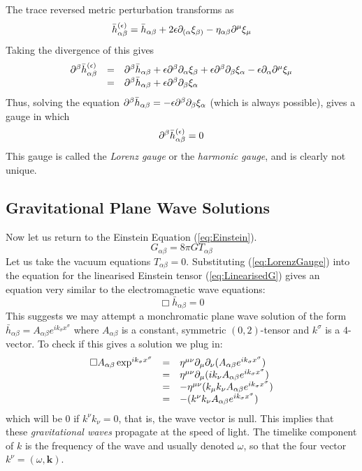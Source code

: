 The trace reversed metric perturbation transforms as 
\[ \bar{h}^{(\epsilon)}_{\alpha \beta} = \bar{h}_{\alpha \beta} + 2 \epsilon {\partial}_{({\alpha}} \xi_{{\beta})} -\eta_{{\alpha} {\beta}}{\partial}^\mu \xi_\mu \]
Taking the divergence of this gives 
\begin{equation}
\begin{array}{lcl}
{\partial}^{\beta} \bar{h}^{(\epsilon)}_{{\alpha} {\beta}} &=& {\partial}^{\beta} \bar{h}_{\alpha \beta} + \epsilon {\partial}^{\beta} {\partial}_{\alpha} \xi_{\beta} + \epsilon {\partial}^{\beta} {\partial}_{\beta} \xi_{\alpha} - \epsilon {\partial}_{\alpha} {\partial}^\mu \xi_\mu\\
&=& {\partial}^{\beta} \bar{h}_{\alpha \beta}+ \epsilon{\partial}^{\beta} {\partial}_{\beta} \xi_{\alpha}
\end{array}
\end{equation}
Thus, solving the equation ${\partial}^{\beta} \bar{h}_{\alpha \beta}=-\epsilon {\partial}^{\beta} {\partial}_{\beta} \xi_{\alpha}$ (which is always possible), gives a gauge in which
\begin{equation}
{\partial}^{\beta} \bar{h}^{(\epsilon)}_{{\alpha} {\beta}} = 0
\label{eq:LorenzGauge}
\end{equation}
This gauge is called the \emph{Lorenz gauge} or the \textit{harmonic gauge}, and is clearly not unique.

\subsection{Gravitational Plane Wave Solutions }
Now let us return to the Einstein Equation (\ref{eq:Einstein}). 
\[ G_{\alpha \beta} = 8 \pi G T_{\alpha \beta} \]
Let us take the vacuum equations $T_{\alpha \beta} =0$. Substituting (\ref{eq:LorenzGauge}) into the equation for the linearised Einstein tensor (\ref{eq:LinearisedG}) gives an equation very similar to the electromagnetic wave equations:
\begin{equation}
\Box \bar{h}_{\alpha \beta} = 0
\end{equation}
This suggests we may attempt a monchromatic plane wave solution of the form $\bar{h}_{\alpha \beta}=A_{\alpha \beta} e^{i k_\sigma x^\sigma}$ where $A_{\alpha \beta}$ is a constant, symmetric $(0,2)$-tensor and $k^\sigma$ is a $4$-vector. To check if this gives a solution we plug in:
\begin{equation}
\begin{array}{lcl}
\Box A_{\alpha \beta} \exp^{i k_\sigma x^\sigma} &=& \eta^{\mu \nu}{\partial}_{\mu} {\partial}_{\nu}(A_{\alpha \beta} e^{i k_\sigma x^\sigma})\\
&=& \eta^{\mu \nu}{\partial}_{\mu}(i k_\nu A_{\alpha \beta} e^{i k_\sigma x^\sigma})\\
&=& -\eta^{\mu \nu}(k_\mu k_\nu A_{\alpha \beta} e^{i k_\sigma x^\sigma})\\
&=& -(k^\nu k_\nu A_{\alpha \beta} e^{i k_\sigma x^\sigma})
\end{array}
\end{equation}
which will be $0$ if $k^\nu k_\nu =0$, that is, the wave vector is null. This implies that these \textit{gravitational waves} propagate at the speed of light. The timelike component of $k$ is the frequency of the wave and usually denoted $\omega$, so that the four vector $k^\nu=(\omega, \textbf{k})$.

